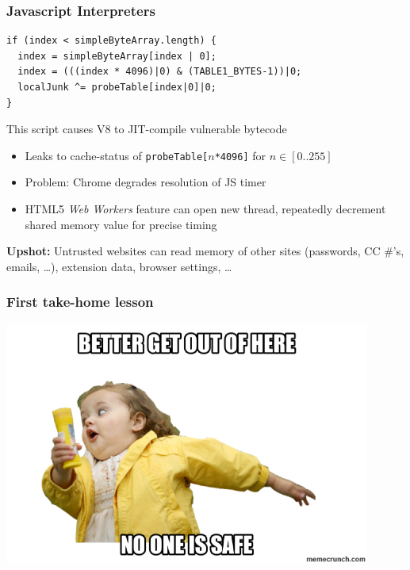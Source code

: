 \documentclass[10pt,handout]{beamer}
\begin{document}
\begin{frame}[fragile]

\frametitle{Javascript Interpreters}

\begin{lstlisting}[basicstyle=\small,style=customjava]
if (index < simpleByteArray.length) {
  index = simpleByteArray[index | 0];
  index = (((index * 4096)|0) & (TABLE1_BYTES-1))|0;
  localJunk ^= probeTable[index|0]|0;
}
\end{lstlisting}

\vspace*{1em}
This script causes V8 to JIT-compile vulnerable bytecode
\pause
\begin{itemize}
  \item Leaks to cache-status of \texttt{probeTable[}$n$\texttt{*4096]} for $n\in[0..255]$
  \pause\item Problem: Chrome degrades resolution of JS timer
  \pause\item HTML5 \emph{Web Workers} feature can open new thread, repeatedly decrement shared memory value for precise timing
\end{itemize}

\pause
\begin{center}
\textbf{Upshot:} Untrusted websites can read memory of other sites (passwords, CC \#'s, emails, \ldots), extension data, browser settings, \ldots
\end{center}

\end{frame}


\begin{frame}

\frametitle{First take-home lesson}

\centering
\includegraphics[width=0.9\textwidth]{unsafe.png}

\end{frame}
\end{document}
